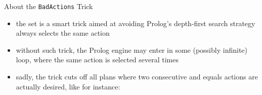 \documentclass[presentation]{beamer}\mode<presentation>{\usetheme{AMSBolognaFC}}
\begin{document}
\begin{frame}[c]{About the \texttt{BadActions} Trick}

    \begin{itemize}
        \item the  set is a smart trick aimed at avoiding Prolog's \alert{depth-first} search strategy always selects the same action

        \vfill

        \item without such trick, the Prolog engine may enter in some (possibly \alert{infinite}) loop, where the same action is selected several times

        \vfill

        \item sadly, the trick \alert{cuts off} all plans where two consecutive and equals actions are actually desired, like for instance:
        
    \end{itemize}

\end{frame}
\end{document}
